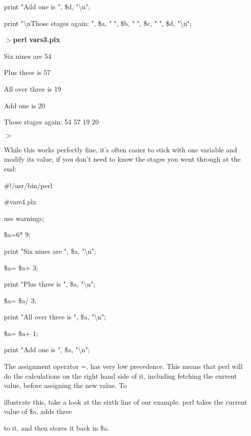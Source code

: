 \documentclass[a4paper,11pt]{book}
\begin{document}
\noindent print "Add one is ", \$d, "\textbackslash n";

\noindent print "\textbackslash nThose stages again: ", \$a, " ", \$b, " ", \$c, " ", \$d, "\textbackslash n";

\noindent 

\noindent $>$\textbf{perl vars3.plx}

\noindent Six nines are 54

\noindent Plus three is 57

\noindent All over three is 19

\noindent Add one is 20

\noindent 

\noindent 

\noindent Those stages again: 54 57 19 20

\noindent $>$

\noindent 

\noindent While this works perfectly fine, it's often easier to stick with one variable and modify its value, if you don't need to know the stages you went through at the end:

\noindent 

\noindent 

\noindent \#!/usr/bin/perl

\noindent \#vars4.plx

\noindent use warnings;

\noindent \$a=6* 9;

\noindent print "Six nines are ", \$a, "\textbackslash n";

\noindent \$a= \$a+ 3;

\noindent print "Plus three is ", \$a, "\textbackslash n";

\noindent \$a= \$a/ 3;

\noindent print "All over three is ", \$a, "\textbackslash n";

\noindent \$a= \$a+ 1;

\noindent print "Add one is ", \$a, "\textbackslash n";

\noindent 

\noindent The assignment operator =, has very low precedence. This means that perl will do the calculations on the right hand side of it, including fetching the current value, before assigning the new value. To

\noindent illustrate this, take a look at the sixth line of our example. perl takes the current value of \$a, adds three

\noindent to it, and then stores it back in \$a.
\end{document}
